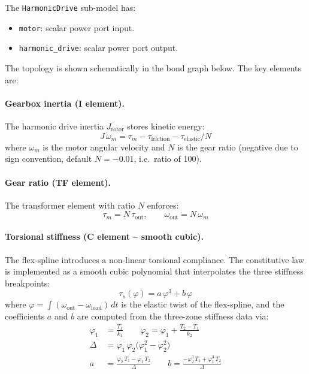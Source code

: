 The \texttt{HarmonicDrive} sub-model has:
\begin{itemize}
  \item \texttt{motor}: scalar power port input.
  \item \texttt{harmonic\_drive}: scalar power port output.
\end{itemize}

The topology is shown schematically in the bond graph below.
The key elements are:

\paragraph{Gearbox inertia (I element).}
The harmonic drive inertia $J_{\text{rotor}}$ stores kinetic energy:
\begin{equation}
  J\,\dot{\omega}_m = \tau_m - \tau_{\text{friction}} - \tau_{\text{elastic}}/N
\end{equation}
where $\omega_m$ is the motor angular velocity and $N$ is the gear ratio (negative due to sign convention, default $N=-0.01$, i.e.\ ratio of 100).

\paragraph{Gear ratio (TF element).}
The transformer element with ratio $N$ enforces:
\begin{equation}
  \tau_m = N \, \tau_{\text{out}}, \qquad \omega_{\text{out}} = N \, \omega_m
\end{equation}

\paragraph{Torsional stiffness (C element -- smooth cubic).}
The flex-spline introduces a non-linear torsional compliance.
The constitutive law is implemented as a smooth cubic polynomial that interpolates the three stiffness breakpoints:
\begin{equation}
  \tau_s(\varphi) = a\,\varphi^3 + b\,\varphi
\end{equation}
where $\varphi = \int(\omega_{\text{out}} - \omega_{\text{load}})\,dt$ is the elastic twist of the flex-spline, and the coefficients $a$ and $b$ are computed from the three-zone stiffness data via:
\begin{align}
  \varphi_1 &= \frac{T_1}{k_1} \qquad \varphi_2 = \varphi_1 + \frac{T_2 - T_1}{k_2} \\
  \Delta &= \varphi_1\,\varphi_2\bigl(\varphi_1^2 - \varphi_2^2\bigr) \\
  a &= \frac{\varphi_2\,T_1 - \varphi_1\,T_2}{\Delta} \qquad
  b = \frac{-\varphi_2^3\,T_1 + \varphi_1^3\,T_2}{\Delta}
\end{align}


